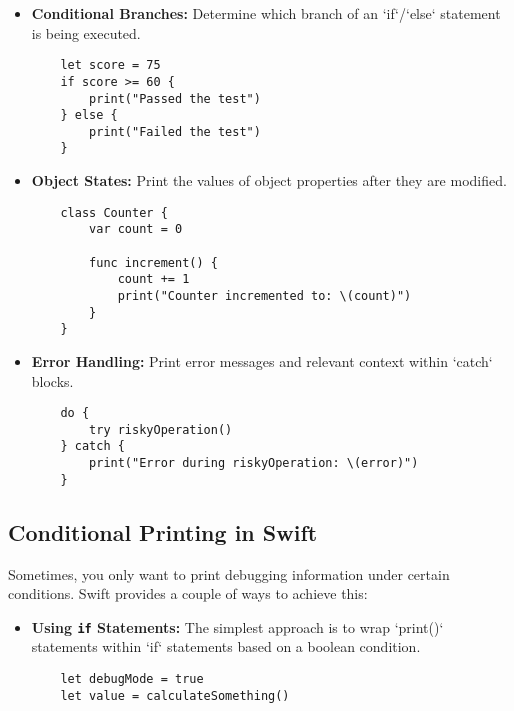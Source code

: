 \documentclass{article}
\begin{document}
{{{{\begin{itemize}
    \begin{verbatim}
    for i in 0..<5 {
        print("Loop iteration: \(i)")
    }
    \end{verbatim}

    \item \textbf{Conditional Branches:} Determine which branch of an `if`/`else` statement is being executed.

    \begin{verbatim}
    let score = 75
    if score >= 60 {
        print("Passed the test")
    } else {
        print("Failed the test")
    }
    \end{verbatim}

    \item \textbf{Object States:} Print the values of object properties after they are modified.

    \begin{verbatim}
    class Counter {
        var count = 0

        func increment() {
            count += 1
            print("Counter incremented to: \(count)")
        }
    }
    \end{verbatim}

    \item \textbf{Error Handling:} Print error messages and relevant context within `catch` blocks.

    \begin{verbatim}
    do {
        try riskyOperation()
    } catch {
        print("Error during riskyOperation: \(error)")
    }
    \end{verbatim}
\end{itemize}

\subsection*{Conditional Printing in Swift}

Sometimes, you only want to print debugging information under certain conditions.  Swift provides a couple of ways to achieve this:

\begin{itemize}
    \item \textbf{Using \texttt{if} Statements:} The simplest approach is to wrap `print()` statements within `if` statements based on a boolean condition.

    \begin{verbatim}
    let debugMode = true
    let value = calculateSomething()


\end{verbatim}
\end{itemize}}}}}
\end{document}
